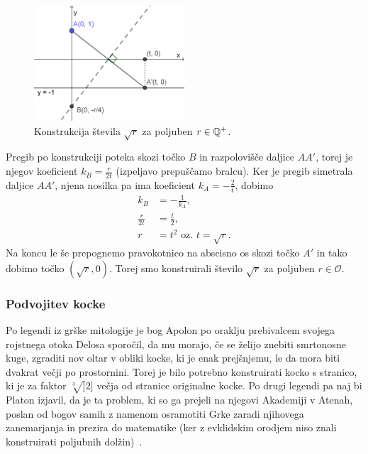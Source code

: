 \begin{figure}[h]
    \centering
    \includegraphics[width=0.5\textwidth]{images/kvadratni_koren.png}
    \caption[Konstrukcija korena]{Konstrukcija števila $\sqrt{r}$ za poljuben $r \in \mathbb Q^{+}$.}
    \label{fig:konstrukcija_korena}
\end{figure}

Pregib po konstrukciji poteka skozi točko $B$ in razpolovišče daljice $AA'$, torej je njegov koeficient $k_B = \frac{r}{2t}$ (izpeljavo prepuščamo bralcu). Ker je pregib simetrala daljice $AA'$, njena nosilka pa ima koeficient $k_A = - \frac{2}{t}$, dobimo
\begin{align*}
    k_B &= - \frac{1}{k_A},\\
    \frac{r}{2t} &= \frac{t}{2},\\
    r &= t^2 \text{ oz. } t = \sqrt{r}.
\end{align*}
Na koncu le še prepognemo pravokotnico na abscisno os skozi točko $A'$ in tako dobimo točko $(\sqrt{r}, 0)$. Torej smo konstruirali število $\sqrt{r}$ za poljuben $r \in \mathcal{O}$.

\subsubsection{Podvojitev kocke}
\label{podpogl:podvojitev_kocke}

Po legendi iz grške mitologije je bog Apolon po oraklju prebivalcem svojega rojstnega otoka Delosa sporočil, da mu morajo, če se želijo znebiti smrtonosne kuge, zgraditi nov oltar v obliki kocke, ki je enak prejšnjemu, le da mora biti dvakrat večji po prostornini. Torej je bilo potrebno konstruirati kocko s stranico, ki je za faktor $\sqrt[3][2]$ večja od stranice originalne kocke. Po drugi legendi pa naj bi Platon izjavil, da je ta problem, ki so ga prejeli na njegovi Akademiji v Atenah, poslan od bogov samih z namenom osramotiti Grke zaradi njihovega zanemarjanja in prezira do matematike (ker z evklidskim orodjem niso znali konstruirati poljubnih dolžin)~\cite[str.\ 29]{geometricconstructions}.

